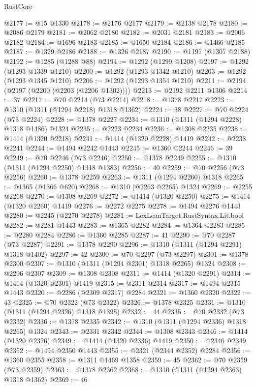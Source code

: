 \begin{lexlean}{RustCore}
\begin{coremodule}
@2177 := @15 @1330
@2178 := @2176 @2177
@2179 := @2138 @2178
@2180 := @2086 @2179
@2181 := @2062 @2180
@2182 := @2031 @2181
@2183 := @2006 @2182
@2184 := @1696 @2183
@2185 := @1650 @2184
@2186 := @1466 @2185
@2187 := @1329 @2186
@2188 := @1326 @2187
@2190 := @1197 (@1307 @2188)
@2192 := @1285 (@1288 @88)
@2194 := @1292 (@1299 @1208)
@2197 := @1292 (@1293 @1339 @1210)
@2200 := @1292 (@1293 @1342 @1210)
@2203 := @1292 (@1293 @1345 @1210)
@2206 := @1292 (@1293 @1354 @1210)
@2211 := @2194 (@2197 (@2200 (@2203 (@2206 @1302))))
@2213 := @2192 @2211 @1306
@2214 := 37
@2217 := @70 @2214 (@73 @2214)
@2218 := @1378 @2217
@2223 := @1310 (@1311 (@1294 @2218) @1318 @1362)
@2224 := 38
@2227 := @70 @2224 (@73 @2224)
@2228 := @1378 @2227
@2234 := @1310 (@1311 (@1294 @2228) @1318 @1486) @1324
@2235 := @2223 @2234
@2236 := @1308 @2235
@2238 := @1414 (@1320 @2218)
@2241 := @1414 (@1320 @2228) @1419
@2242 := @2238 @2241
@2244 := @1494 @2242 @1443
@2245 := @1360 @2244
@2246 := 39
@2249 := @70 @2246 (@73 @2246)
@2250 := @1378 @2249
@2255 := @1310 (@1311 (@1294 @2250) @1318 @1383)
@2256 := 40
@2259 := @70 @2256 (@73 @2256)
@2260 := @1378 @2259
@2263 := @1311 (@1294 @2260) @1318
@2265 := @1365 (@1366 @620)
@2268 := @1310 (@2263 @2265) @1324
@2269 := @2255 @2268
@2270 := @1308 @2269
@2272 := @1414 (@1320 @2250)
@2275 := @1414 (@1320 @2260) @1419
@2276 := @2272 @2275
@2278 := @1494 @2276 @1443
@2280 := @2245 (@2270 @2278)
@2281 := LexLeanTarget.RustSyntax.Lit.bool
@2282 := @2281 @1443
@2283 := @1365 @2282
@2284 := @1364 @2283
@2285 := @2280 @2284
@2286 := @1360 @2285
@2287 := 41
@2290 := @70 @2287 (@73 @2287)
@2291 := @1378 @2290
@2296 := @1310 (@1311 (@1294 @2291) @1318 @1402)
@2297 := 42
@2300 := @70 @2297 (@73 @2297)
@2301 := @1378 @2300
@2307 := @1310 (@1311 (@1294 @2301) @1318 @2265) @1324
@2308 := @2296 @2307
@2309 := @1308 @2308
@2311 := @1414 (@1320 @2291)
@2314 := @1414 (@1320 @2301) @1419
@2315 := @2311 @2314
@2317 := @1494 @2315 @1443
@2320 := @2286 (@2309 @2317) @2284
@2321 := @1360 @2320
@2322 := 43
@2325 := @70 @2322 (@73 @2322)
@2326 := @1378 @2325
@2331 := @1310 (@1311 (@1294 @2326) @1318 @1395)
@2332 := 44
@2335 := @70 @2332 (@73 @2332)
@2336 := @1378 @2335
@2342 := @1310 (@1311 (@1294 @2336) @1318 @2265) @1324
@2343 := @2331 @2342
@2344 := @1308 @2343
@2346 := @1414 (@1320 @2326)
@2349 := @1414 (@1320 @2336) @1419
@2350 := @2346 @2349
@2352 := @1494 @2350 @1443
@2355 := @2321 (@2344 @2352) @2284
@2356 := @1360 @2355
@2358 := @1311 @1469 @1358
@2359 := 45
@2362 := @70 @2359 (@73 @2359)
@2363 := @1378 @2362
@2368 := @1310 (@1311 (@1294 @2363) @1318 @1362)
@2369 := 46

\end{coremodule}
\end{lexlean}
